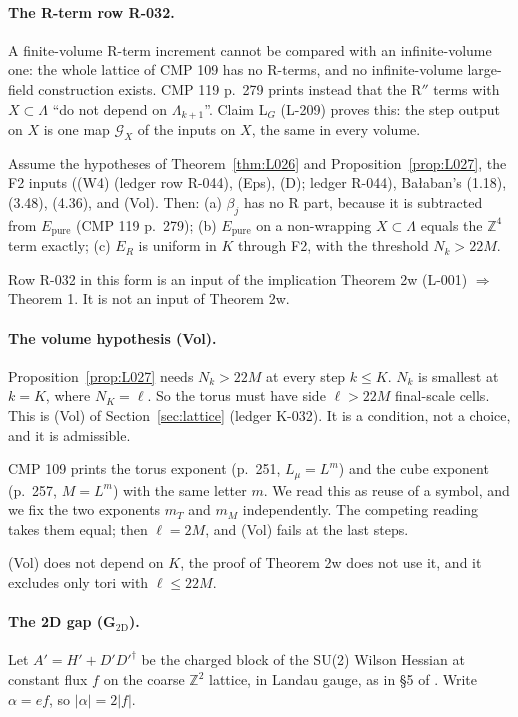 \paragraph{The R-term row R-032.} A finite-volume R-term increment cannot be compared with an infinite-volume one: the whole lattice of CMP 109 has no R-terms, and no infinite-volume large-field construction exists. CMP 119 p.~279 prints instead that the R$''$ terms with $X\subset\Lambda$ ``do not depend on $\Lambda_{k+1}$''. Claim L$_G$ (L-209) proves this: the step output on $X$ is one map $\mathcal G_X$ of the inputs on $X$, the same in every volume.

\begin{proposition}[Row R-032]\label{src:R032}
Assume the hypotheses of Theorem~\ref{thm:L026} and Proposition~\ref{prop:L027}, the F2 inputs ((W4) (ledger row R-044), (Eps), (D); ledger R-044), Ba{\l}aban's (1.18), (3.48), (4.36), and (Vol). Then:
(a) $\beta_j$ has no R part, because it is subtracted from $E_{\mathrm{pure}}$ (CMP 119 p.~279);
(b) $E_{\mathrm{pure}}$ on a non-wrapping $X\subset\Lambda$ equals the $\mathbb Z^4$ term exactly;
(c) $E_R$ is uniform in $K$ through F2, with the threshold $N_k>22M$.
\end{proposition}
Row R-032 in this form is an input of the implication Theorem 2w (L-001) $\Rightarrow$ Theorem 1. It is not an input of Theorem 2w.

\paragraph{The volume hypothesis (Vol).} Proposition~\ref{prop:L027} needs $N_k>22M$ at every step $k\le K$. $N_k$ is smallest at $k=K$, where $N_K=\ell$. So the torus must have side $\ell>22M$ final-scale cells. This is (Vol) of Section~\ref{sec:lattice} (ledger K-032). It is a condition, not a choice, and it is admissible.
\begin{convention}\label{conv:src-mTmM}
CMP 109 prints the torus exponent (p.~251, $L_\mu=L^m$) and the cube exponent (p.~257, $M=L^m$) with the same letter $m$. We read this as reuse of a symbol, and we fix the two exponents $m_T$ and $m_M$ independently. The competing reading takes them equal; then $\ell=2M$, and (Vol) fails at the last steps.
\end{convention}
(Vol) does not depend on $K$, the proof of Theorem 2w does not use it, and it excludes only tori with $\ell\le22M$.

\paragraph{The 2D gap (G$_{\mathrm{2D}}$).} Let $A'=H'+D'D'^\dagger$ be the charged block of the SU(2) Wilson Hessian at constant flux $f$ on the coarse $\mathbb Z^2$ lattice, in Landau gauge, as in \S5 of . Write $\alpha=ef$, so $|\alpha|=2|f|$.

